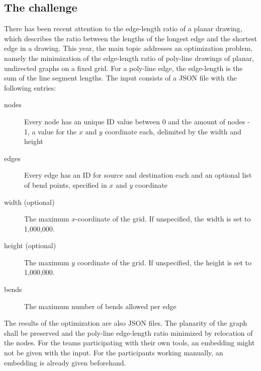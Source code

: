 \subsection{The challenge}
There has been recent attention to the edge-length ratio of a planar drawing, which describes the ratio between the lengths of the longest edge and the shortest edge in a drawing. 
\newline This year, the main topic addresses an optimization problem, namely the minimization of the edge-length ratio of poly-line drawings of planar, undirected graphs on a fixed grid. For a poly-line edge, the edge-length is the sum of the line segment lengths.
\bigbreak The input consists of a JSON file with the following entries:
\begin{description}
	\item[nodes] Every node has an unique ID value between 0 and the amount of nodes - 1, a value for the $x$ and $y$ coordinate each, delimited by the width and height
	\item[edges] Every edge has an ID for source and destination each and an optional list of bend points, specified in $x$ and $y$ coordinate
	\item[width (optional)] The maximum $x$-coordinate of the grid. If unspecified, the width is set to 1,000,000.
	\item[height (optional)] The maximum $y$ coordinate of the grid. If unspecified, the height is set to 1,000,000.
	\item[bends] The maximum number of bends allowed per edge
\end{description}
The results of the optimization are also JSON files. The planarity of the graph shall be preserved and the poly-line edge-length ratio minimized by relocation of the nodes.
\bigbreak For the teams participating with their own tools, an embedding might not be given with the input. For the participants working manually, an embedding is already given beforehand.
